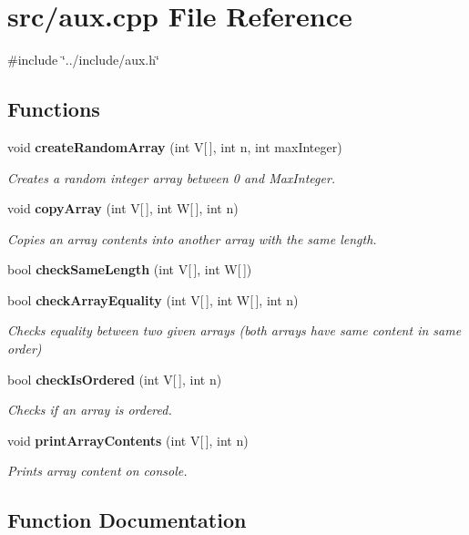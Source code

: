 \section{src/aux.cpp \-File \-Reference}
\label{aux_8cpp}
{\ttfamily \#include \char`\"{}../include/aux.\-h\char`\"{}}\*
\subsection*{\-Functions}
\begin{DoxyCompactItemize}
\item 
void {\bf create\-Random\-Array} (int \-V[$\,$], int n, int max\-Integer)
\begin{DoxyCompactList}\small\item\em \-Creates a random integer array between 0 and \-Max\-Integer. \end{DoxyCompactList}\item 
void {\bf copy\-Array} (int \-V[$\,$], int \-W[$\,$], int n)
\begin{DoxyCompactList}\small\item\em \-Copies an array contents into another array with the same length. \end{DoxyCompactList}\item 
bool {\bf check\-Same\-Length} (int \-V[$\,$], int \-W[$\,$])
\item 
bool {\bf check\-Array\-Equality} (int \-V[$\,$], int \-W[$\,$], int n)
\begin{DoxyCompactList}\small\item\em \-Checks equality between two given arrays (both arrays have same content in same order) \end{DoxyCompactList}\item 
bool {\bf check\-Is\-Ordered} (int \-V[$\,$], int n)
\begin{DoxyCompactList}\small\item\em \-Checks if an array is ordered. \end{DoxyCompactList}\item 
void {\bf print\-Array\-Contents} (int \-V[$\,$], int n)
\begin{DoxyCompactList}\small\item\em \-Prints array content on console. \end{DoxyCompactList}\end{DoxyCompactItemize}


\subsection{\-Function \-Documentation}

